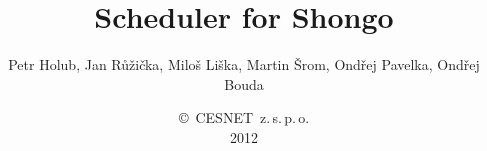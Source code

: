 \documentclass[a4paper]{report}
\begin{document}
\title{Scheduler for Shongo}
\author{Petr Holub, Jan Růžička, Miloš Liška, Martin Šrom, Ondřej Pavelka, 
        Ondřej Bouda}
\date{\copyright~CESNET~z.\,s.\,p.\,o.\\2012}
\maketitle
\tableofcontents






\end{document}

